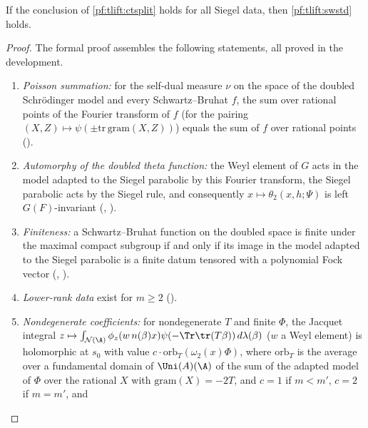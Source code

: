 \begin{theorem}\label{pf:tlift:swfromct}
If the conclusion of \cref{pf:tlift:ctsplit} holds for all Siegel data, then \cref{pf:tlift:swstd} holds.
\end{theorem}

\begin{proof}
The formal proof assembles the following statements, all proved in the development.
\begin{enumerate}[label=(\arabic*),nosep]
\item \emph{Poisson summation:} for the self-dual measure $\nu$ on the space of the doubled Schr\"odinger model and every
  Schwartz--Bruhat $f$, the sum over rational points of the Fourier transform of $f$ (for the pairing
  $(X,Z)\mapsto\psi(\pm\mathrm{tr}\,\mathrm{gram}(X,Z))$) equals the sum of $f$ over rational points
  ().
\item \emph{Automorphy of the doubled theta function:} the Weyl element of $G$ acts in the model adapted to the Siegel
  parabolic by this Fourier transform, the Siegel parabolic acts by the Siegel rule, and consequently
  $x\mapsto\theta_2(x,h;\Psi)$ is left $G(F)$-invariant
  (,
  ).
\item \emph{Finiteness:} a Schwartz--Bruhat function on the doubled space is finite under the maximal compact
  subgroup if and only if its image in the model adapted to the Siegel parabolic is a finite datum tensored with a
  polynomial Fock vector (,
  ).
\item \emph{Lower-rank data} exist for $m\ge2$ ().
\item \emph{Nondegenerate coefficients:} for nondegenerate $T$ and finite $\Phi$, the Jacquet integral
  $z\mapsto\int_{\mathcal N(\A)}\phi_z(w\,n(\beta)x)\psi(-\Tr\tr(T\beta))\,d\lambda(\beta)$ ($w$ a Weyl element) is holomorphic at $s_0$ with
  value $c\cdot\mathrm{orb}_T(\omega_2(x)\Phi)$, where $\mathrm{orb}_T$ is the average over a fundamental domain of $\Uni(A)(\A)$ of the
  sum of the adapted model of $\Phi$ over the rational $X$ with $\mathrm{gram}(X)=-2T$, and $c=1$ if $m<m'$, $c=2$ if $m=m'$, and

\end{enumerate}
\end{proof}
